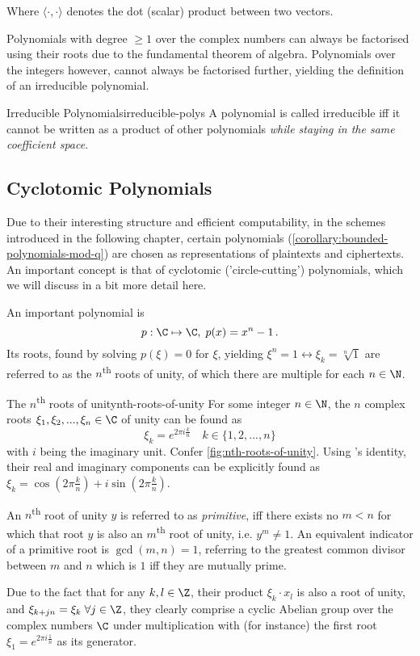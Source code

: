 Where $\langle \cdot, \cdot \rangle$ denotes the dot (scalar) product between two vectors.

Polynomials with degree $\geq 1$ over the complex numbers can always be factorised using their roots due to the fundamental theorem of algebra.
Polynomials over the integers however, cannot always be factorised further, yielding the definition of an irreducible polynomial.

\begin{definition}{Irreducible Polynomials}{irreducible-polys}
  A polynomial is called irreducible \gls{iff} it cannot be written as a product of other polynomials \textsl{while staying in the same coefficient space}.
\end{definition}

\subsection{Cyclotomic Polynomials}
Due to their interesting structure and efficient computability, in the schemes introduced in the following chapter, certain polynomials (\cref{corollary:bounded-polynomials-mod-q}) are chosen as representations of plaintexts and ciphertexts.
An important concept is that of cyclotomic ('circle-cutting') polynomials, which we will discuss in a bit more detail here.

An important polynomial is $$p: \C \mapsto \C, \; p(x) = x^n - 1 \,.$$
Its roots, found by solving $p(\xi) = 0$ for $\xi$, yielding $\xi^n = 1 \leftrightarrow \xi_k = \sqrt[n]{1}$ are referred to as the $n$\textsuperscript{th} roots of unity, of which there are multiple for each $n \in \N$.

\begin{lemma}{The $n$\textsuperscript{th} roots of unity}{nth-roots-of-unity}
  For some integer $n \in \N$, the $n$ complex roots $\xi_1, \xi_2, ..., \xi_n \in \C$ of unity can be found as $$\xi_k = e^{2\pi i \frac{k}{n}} \quad k \in \{1, 2, ..., n\}$$ with $i$ being the imaginary unit.
  Confer \cref{fig:nth-roots-of-unity}.
  Using 's identity, their real and imaginary components can be explicitly found as $\xi_k = \cos(2\pi \frac{k}{n}) + i \sin(2\pi \frac{k}{n})$.

  An $n$\textsuperscript{th} root of unity $y$ is referred to as \textit{primitive}, \gls{iff} there exists no $m < n$ for which that root $y$ is also an $m$\textsuperscript{th} root of unity, i.e. $y^m \neq 1$.
  An equivalent indicator of a primitive root is $\gcd(m, n) = 1$, referring to the greatest common divisor between $m$ and $n$ which is $1$ \gls{iff} they are mutually prime.
\end{lemma}
Due to the fact that for any $k, l \in \Z$, their product $\xi_k \cdot x_l$ is also a root of unity, and $\xi_{k+jn} = \xi_k \; \forall j \in \Z$, they clearly comprise a cyclic Abelian group over the complex numbers $\C$ under multiplication with (for instance) the first root $\xi_1 = e^{2\pi i \frac{1}{n}}$ as its generator.

